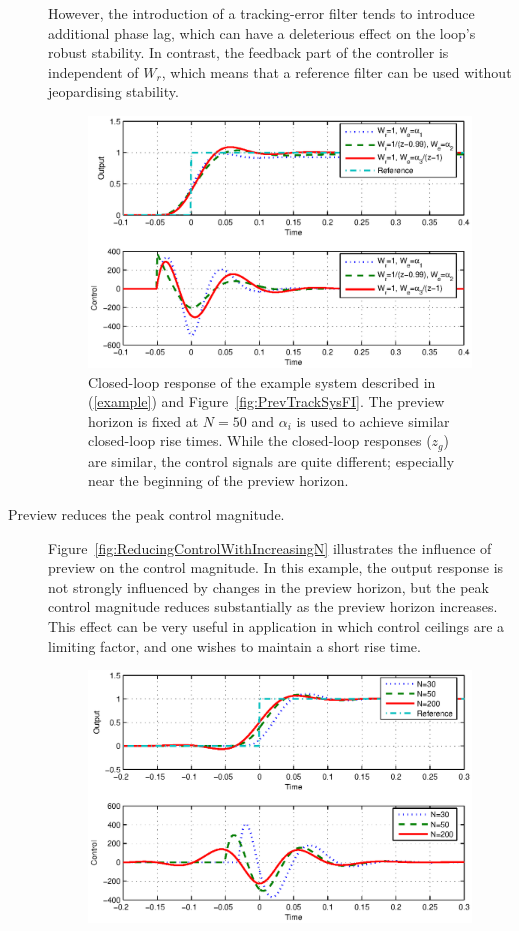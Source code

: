 \begin{description}
However, the introduction of a tracking-error filter tends to introduce additional phase lag, which can have a deleterious effect on the loop's robust stability. In contrast, the feedback part of the controller is independent of $W_r$, which means that a reference filter can be used without jeopardising stability.  
\begin{figure}
\begin{center}
\includegraphics[width=\columnwidth]{./diags/CompWzWrNormForSimilarResp.eps}
\end{center}	
\caption{Closed-loop response of the example system described in (\ref{example}) and Figure~\ref{fig:PrevTrackSysFI}. The preview horizon is fixed at $N=50$ and $\alpha_i$ is used to achieve similar closed-loop rise times. While the closed-loop responses ($z_g$) are similar, the control signals are quite different; especially near the beginning of the preview horizon. \label{fig:CompWzWrNormForSimilarResp}}
\end{figure}
\item[Preview reduces the peak control magnitude.] 
Figure~\ref{fig:ReducingControlWithIncreasingN} illustrates the influence of preview on the control magnitude. In this example, the output response is not strongly influenced by changes in the preview horizon, but the peak control magnitude reduces substantially as the preview horizon increases. This effect can be very useful in application in which control ceilings are a limiting factor, and one wishes to maintain a short rise time.
\begin{figure}
\includegraphics[width=\columnwidth]{./diags/ReducingControlWithIncreasingN.eps}

\end{figure}
\end{description}
